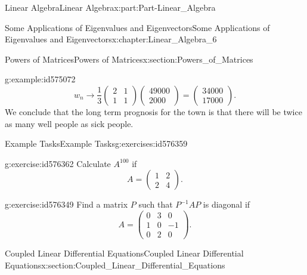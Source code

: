 \documentclass[oneside,10pt,]{book}
\numberwithin{equation}{section}
\newcommand{\amp}{&}
\begin{document}
\begin{partptx}{Linear Algebra}{}{Linear Algebra}{}{}{x:part:Part-Linear_Algebra}
\begin{chapterptx}{Some Applications of Eigenvalues and Eigenvectors}{}{Some Applications of Eigenvalues and Eigenvectors}{}{}{x:chapter:Linear_Algebra_6}
\begin{sectionptx}{Powers of Matrices}{}{Powers of Matrices}{}{}{x:section:Powers_of_Matrices}
\begin{example}{}{g:example:id575072}
\begin{equation*}
w_n \to \dfrac{1}{3} \begin{pmatrix} 2 \amp 1 \\ 1 \amp 1 \end{pmatrix} \begin{pmatrix} 49000 \\ 2000 \end{pmatrix} = \begin{pmatrix} 34000 \\ 17000 \end{pmatrix}\text{.}
\end{equation*}
We conclude that the long term prognosis for the town is that there will be twice as many well people as sick people.%
\end{example}
%
%
\typeout{************************************************}
\typeout{************************************************}
%
\begin{exercises-subsection-numberless}{Example Tasks}{}{Example Tasks}{}{}{g:exercises:id576359}
\begin{divisionexercise}{1}{}{}{g:exercise:id576362}%
Calculate \(A^{100}\) if%
\begin{equation*}
A = \begin{pmatrix} 1 \amp 2 \\ 2 \amp 4 \end{pmatrix}\text{.}
\end{equation*}
%
\end{divisionexercise}%
\begin{divisionexercise}{2}{}{}{g:exercise:id576349}%
Find a matrix \(P\) such that \(P^{-1} AP\) is diagonal if%
\begin{equation*}
A = \begin{pmatrix} 0 \amp 3 \amp 0 \\ 1 \amp 0 \amp -1 \\ 0 \amp 2 \amp 0 \end{pmatrix}\text{.}
\end{equation*}
%
\end{divisionexercise}%
\end{exercises-subsection-numberless}
\end{sectionptx}
%
%
\typeout{************************************************}
\typeout{************************************************}
%
\begin{sectionptx}{Coupled Linear Differential Equations}{}{Coupled Linear Differential Equations}{}{}{x:section:Coupled_Linear_Differential_Equations}

\end{sectionptx}
\end{chapterptx}
\end{partptx}
\end{document}
